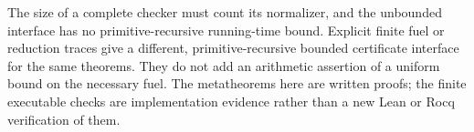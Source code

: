 The size of a complete checker must count its normalizer, and the
unbounded interface has no primitive-recursive running-time bound.
Explicit finite fuel or reduction traces give a different,
primitive-recursive bounded certificate interface for the same
theorems. They do not add an arithmetic assertion of a uniform bound
on the necessary fuel. The metatheorems here are written proofs; the
finite executable checks are implementation evidence rather than a
new Lean or Rocq verification of them.
